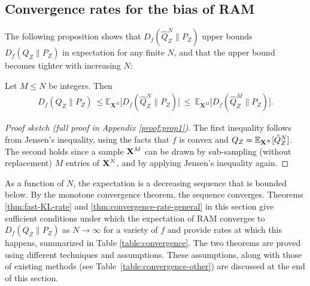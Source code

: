 \subsection{Convergence rates for the bias of RAM}
The following proposition shows that $D_f(\hat{Q}_Z^N \| P_Z)$ upper bounds $D_f(Q_{Z} \| P_Z)$ in expectation for any finite $N$, and that the upper bound becomes tighter with increasing $N$:
%
\begin{proposition}\label{prop:upper-bound}
Let $M \leq N$ be integers. Then
\begin{align}
\label{eq:our-estimate}
    D_f(Q_Z \| P_Z) \ \leq 
    \mathbb{E}_{\mathbf{X}^N} \bigl[D_f(\hat{Q}_Z^N \| P_Z)\bigr] \  \leq \ \mathbb{E}_{\mathbf{X}^M} \bigl[D_f(\hat{Q}_Z^M \| P_Z)\bigr].
\end{align}
\end{proposition}
\begin{proof}[Proof sketch (full proof in Appendix \ref{proof:prop1})]
The first inequality follows from Jensen's inequality, using the facts that $f$ is convex and ${Q_Z = \mathbb{E}_{\mathbf{X}^N} [\hat{Q}_Z^N}]$.
The second holds since a sample ${\mathbf{X}^M}$ can be drawn by sub-sampling (without replacement) $M$ entries of ${\mathbf{X}^N}$, and by applying Jensen's inequality again.
\end{proof}
As a function of $N$, the expectation is a decreasing sequence that is bounded below.
By the monotone convergence theorem, the sequence converges.
Theorems \ref{thm:fast-KL-rate} and \ref{thm:convergence-rate-general} in this section give sufficient conditions under which the expectation of RAM converges to $D_f(Q_{Z} \| P_Z)$ as $N\to\infty$ for a variety of $f$ and provide rates at which this happens, summarized in Table \ref{table:convergence}.
The two theorems are proved using different techniques and assumptions. 
These assumptions, along with those of existing methods (see Table~\ref{table:convergence-other}) are discussed at the end of this section.

